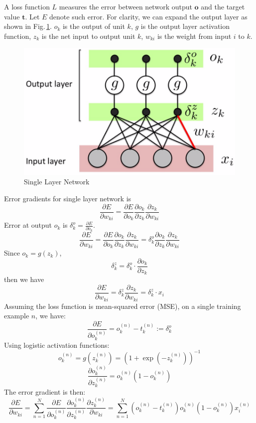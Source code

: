 A loss function $L$ measures the error between network output $\mathbf{o}$ and the target value $\mathbf{t}$. Let $E$ denote such error. For clarity, we can expand the output layer as shown in Fig.\,\ref{expand2}. $o_k$ is the output of unit $k$, $g$ is the output layer activation function, $z_{k}$ is the net input to output unit $k$, $w_{ki}$ is the weight from input $i$ to $k$. 
\begin{figure}[h]
	\centering
	\includegraphics[scale=0.5]{Figs/singlelayer2.png}
    \caption{Single Layer Network}
    \label{expand2}
\end{figure}
Error gradients for single layer network is 
$$\frac{\partial E}{\partial w_{ki}} = 
    \frac{\partial E}{\partial o_{k}} 
    \frac{\partial o_{k}}{\partial z_{k}} 
    \frac{\partial z_{k}}{\partial w_{ki}} $$
Error at output $o_k$ is $\delta_k^o =  \frac{\partial E}{\partial o_{k}} $.
$$\frac{\partial E}{\partial w_{ki}} = 
    \frac{\partial E}{\partial o_{k}} 
    \frac{\partial o_{k}}{\partial z_{k}} 
    \frac{\partial z_{k}}{\partial w_{ki}} 
    =  
    \delta_k^o 
    \frac{\partial o_{k}}{\partial z_{k}} 
    \frac{\partial z_{k}}{\partial w_{ki}}  $$
Since $o_k = g(z_k)$, $$\delta_k^z = \delta_k^o \cdot \frac{\partial o_{k}}{\partial z_{k}}$$ then we have $$\frac{\partial E}{\partial w_{ki}} = \delta_k^z \frac{\partial z_{k}}{\partial w_{ki}} =  \delta_k^z \cdot x_i$$ 
Assuming the loss function is mean-squared error (MSE), on a single training example $n$, we have:
$$\frac{\partial E}{\partial o_k^{(n)}} = o_k^{(n)} - t_k^{(n)} := \delta_k^o$$Using logistic activation functions:$$ o_k^{(n)} = g(z_k^{(n)}) = (1 + \exp(-z_k^{(n)}))^{-1}$$
$$\frac{\partial o_k^{(n)}}{\partial z_k^{(n)}} = o_k^{(n)}(1-o_k^{(n)})$$
The error gradient is then:
$$\frac{\partial E}{\partial w_{ki}} =  \sum_{n=1}^N \frac{\partial E}{\partial o_{k}^{(n)}}\frac{\partial o_{k}^{(n)}}{\partial z_{k}^{(n)}} \frac{\partial z_{k}^{(n)}}{\partial w_{ki}} = \sum_{n=1}^N (o_k^{(n)} - t_k^{(n)})o_k^{(n)} (1-o_k^{(n)}) x_i^{(n)}$$

